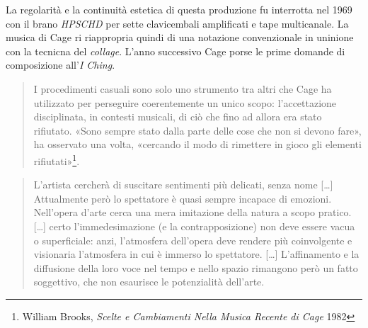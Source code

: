 \documentclass[%
			   a4paper,
			   twoside
			   ]{book}
\begin{document}
\begin{multicols}{2}
La regolarità e la continuità estetica di questa produzione fu interrotta nel 1969
con il brano \emph{HPSCHD} per sette clavicembali amplificati e tape multicanale.
La musica di Cage ri riappropria quindi di una notazione convenzionale in uninione
con la tecnicna del \emph{collage}. L'anno successivo Cage porse le prime domande
di composizione all'\emph{I Ching}.

\begin{quote}
	I procedimenti casuali sono solo uno strumento tra altri che Cage ha utilizzato
	per perseguire coerentemente un unico scopo: l'accettazione disciplinata, in
	contesti musicali, di ciò che fino ad allora era stato rifiutato. «Sono sempre
	stato dalla parte delle cose che non si devono fare», ha osservato una volta,
	«cercando il modo di rimettere in gioco gli elementi rifiutati»\footnote{William
	Brooks, \emph{Scelte e Cambiamenti Nella Musica Recente di Cage} 1982}.
\end{quote}

\centering{***}

\begin{quote}
	L'artista cercherà di suscitare sentimenti più delicati, senza nome [\ldots]
	Attualmente però lo spettatore è quasi sempre incapace di emozioni.
	Nell'opera d'arte cerca una mera imitazione della natura a scopo pratico.
	[\ldots] certo l'immedesimazione (e la contrapposizione) non deve essere
	vacua o superficiale: anzi, l'atmosfera dell'opera deve rendere più
	coinvolgente e visionaria l'atmosfera in cui è immerso lo spettatore. [\ldots]
	L'affinamento e la diffusione della loro voce nel tempo e nello spazio
	rimangono però un fatto soggettivo, che non esaurisce le potenzialità dell'arte.
\end{quote}

\end{multicols}

\end{document}
